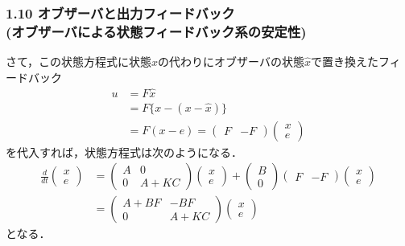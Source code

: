 \begin{frame}[t]
\frametitle{1.10 オブザーバと出力フィードバック \\
(オブザーバによる状態フィードバック系の安定性)}
さて，この状態方程式に状態$x$の代わりにオブザーバの状態$\hat{x}$で置き換えたフィードバック
\begin{align}
 u &= F \hat{x}
\nonumber \\
   &= F \{x - (x-\hat{x})\}
\nonumber \\
   &= F (x - e)
    = \left( \begin{array}{cc} F & -F \end{array} \right)
      \left( \begin{array}{c}
               x \\
               e
             \end{array} \right)
\end{align}
を代入すれば，状態方程式は次のようになる．
\begin{align}
 \frac{d}{dt}
  \left(\begin{array}{c}
         x \\
   e
  \end{array}\right)
  &=
  \left(\begin{array}{cc}
         A & 0 \\
   0 & A+KC
  \end{array}\right)
  \left(\begin{array}{c}
         x \\
   e
  \end{array}\right)
  +
  \left(\begin{array}{c}
         B \\
   0
  \end{array}\right)
  \left( \begin{array}{cc} F & -F \end{array} \right)
  \left( \begin{array}{c}
               x \\
               e
         \end{array} \right)
\nonumber \\
 &=
 \left(\begin{array}{cc}
        A + BF & -BF \\
  0 & A + KC
       \end{array}\right)
 \left(\begin{array}{c}
         x \\
   e
       \end{array}\right)
\end{align}
となる．
\end{frame}


